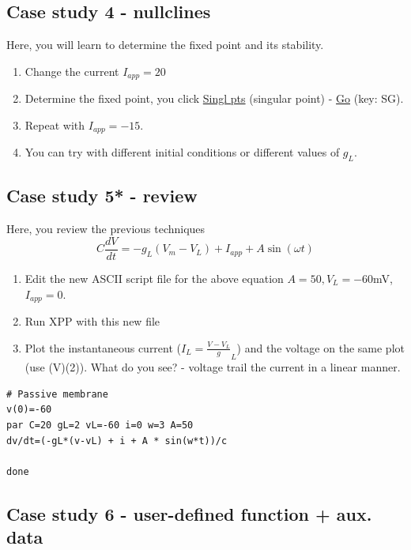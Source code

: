 \subsection{Case study 4 - nullclines}
\label{sec:case-study-4}

Here, you will learn to determine the fixed point and its stability.
\begin{enumerate}
\item Change the current $I_{app}=20$

\item Determine the fixed point, you click \underline{Singl pts}
(singular point) - \underline{Go} (key: SG).

\item Repeat with $I_{app}=-15$.

\item You can try with different initial conditions or different
  values of $g_L$.
\end{enumerate}

\subsection{Case study 5* - review}
\label{sec:case-study-5}

Here, you review the previous techniques
\begin{equation}
  \label{eq:124}
  C\frac{dV}{dt} = -g_L(V_m-V_L) + I_{app} + A \sin(\omega t)
\end{equation}

\begin{enumerate}
\item Edit the new ASCII script file for the above equation
$A=50, V_L = -60$mV, $I_{app} = 0$.
\item Run XPP with this new file

\item Plot the instantaneous current ($I_L=\frac{V-V_L}g_L$) and the
  voltage on the same plot (use (V)(2)). What do you see? - voltage
  trail the current in a linear manner.
\end{enumerate}

\begin{verbatim}
# Passive membrane
v(0)=-60
par C=20 gL=2 vL=-60 i=0 w=3 A=50
dv/dt=(-gL*(v-vL) + i + A * sin(w*t))/c

done
\end{verbatim}
\subsection{Case study 6 - user-defined function + aux. data}
\label{sec:case-study-6}

